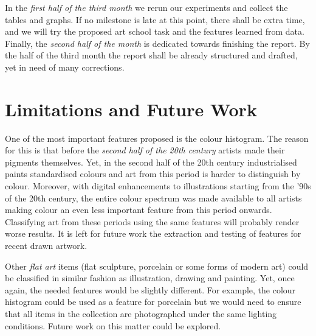 \documentclass[a4paper,twocolumn]{article}
\begin{document}
In the \emph{first half of the third month} we rerun our experiments and
collect the tables and graphs.  If no milestone is late at this point, there
shall be extra time, and we will try the proposed art school task and the
features learned from data.  Finally, the \emph{second half of the month} is
dedicated towards finishing the report.  By the half of the third month the
report shall be already structured and drafted, yet in need of many
corrections.

\section{Limitations and Future Work}

One of the most important features proposed is the colour histogram.  The
reason for this is that before the \emph{second half of the 20th century}
artists made their pigments themselves.  Yet, in the second half of the 20th
century industrialised paints standardised colours and art from this period is
harder to distinguish by colour.  Moreover, with digital enhancements to
illustrations starting from the '90s of the 20th century, the entire colour
spectrum was made available to all artists making colour an even less important
feature from this period onwards.  Classifying art from these periods using the
same features will probably render worse results.  It is left for future work
the extraction and testing of features for recent drawn artwork.

Other \emph{flat art} items (flat sculpture, porcelain or some forms of modern
art) could be classified in similar fashion as illustration, drawing and
painting.  Yet, once again, the needed features would be slightly different.
For example, the colour histogram could be used as a feature for porcelain but
we would need to ensure that all items in the collection are photographed under
the same lighting conditions.  Future work on this matter could be explored.



\end{document}
